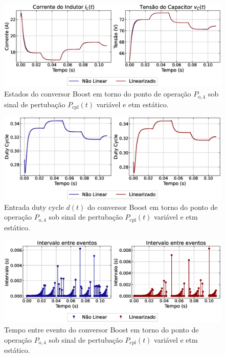 \begin{figure}[H]
  \centering
  \captionsetup{justification=centering}
  \includegraphics[width=1.\textwidth]{figuras/dynamic-etm/boost/sim2/op2/result.eps}
  \caption{Estados do conversor Boost em torno do ponto de operação $P_{\mathrm{o}, 4}$ sob sinal de pertubação $P_{\mathrm{cpl}}(t)$ variável e \acrshort{etm} estático.}
\end{figure}

\begin{figure}[H]
  \centering
  \captionsetup{justification=centering}
  \includegraphics[width=1.\textwidth]{figuras/dynamic-etm/boost/sim2/op2/duty-cycle.eps}
  \caption{Entrada duty cycle $d(t)$ do conversor Boost em torno do ponto de operação $P_{\mathrm{o}, 4}$ sob sinal de pertubação $P_{\mathrm{cpl}}(t)$ variável e \acrshort{etm} estático.}
\end{figure}

\begin{figure}[H]
  \centering
  \captionsetup{justification=centering}
  \includegraphics[width=1.\textwidth]{figuras/dynamic-etm/boost/sim2/op2/inter-event-times.eps}
  \caption{Tempo entre evento do conversor Boost em torno do ponto de operação $P_{\mathrm{o}, 4}$ sob sinal de pertubação $P_{\mathrm{cpl}}(t)$ variável e \acrshort{etm} estático.}
\end{figure}

